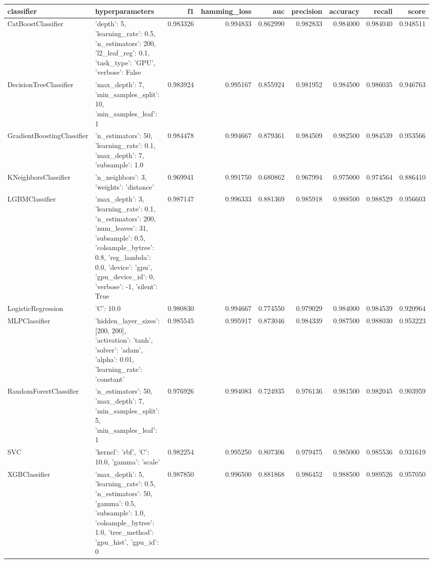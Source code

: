 \begin{tabular}{llrrrrrrr}
\toprule
classifier & hyperparameters & f1 & hamming_loss & auc & precision & accuracy & recall & score \\
\midrule
CatBoostClassifier & {'depth': 5, 'learning_rate': 0.5, 'n_estimators': 200, 'l2_leaf_reg': 0.1, 'task_type': 'GPU', 'verbose': False} & 0.983326 & 0.994833 & 0.862990 & 0.982833 & 0.984000 & 0.984040 & 0.948511 \\
DecisionTreeClassifier & {'max_depth': 7, 'min_samples_split': 10, 'min_samples_leaf': 1} & 0.983924 & 0.995167 & 0.855924 & 0.981952 & 0.984500 & 0.986035 & 0.946763 \\
GradientBoostingClassifier & {'n_estimators': 50, 'learning_rate': 0.1, 'max_depth': 7, 'subsample': 1.0} & 0.984478 & 0.994667 & 0.879361 & 0.984509 & 0.982500 & 0.984539 & 0.953566 \\
KNeighborsClassifier & {'n_neighbors': 3, 'weights': 'distance'} & 0.969941 & 0.991750 & 0.680862 & 0.967994 & 0.975000 & 0.974564 & 0.886410 \\
LGBMClassifier & {'max_depth': 3, 'learning_rate': 0.1, 'n_estimators': 200, 'num_leaves': 31, 'subsample': 0.5, 'colsample_bytree': 0.8, 'reg_lambda': 0.0, 'device': 'gpu', 'gpu_device_id': 0, 'verbose': -1, 'silent': True} & 0.987147 & 0.996333 & 0.881369 & 0.985918 & 0.988500 & 0.988529 & 0.956603 \\
LogisticRegression & {'C': 10.0} & 0.980830 & 0.994667 & 0.774550 & 0.979029 & 0.984000 & 0.984539 & 0.920964 \\
MLPClassifier & {'hidden_layer_sizes': [200, 200], 'activation': 'tanh', 'solver': 'adam', 'alpha': 0.01, 'learning_rate': 'constant'} & 0.985545 & 0.995917 & 0.873046 & 0.984339 & 0.987500 & 0.988030 & 0.953223 \\
RandomForestClassifier & {'n_estimators': 50, 'max_depth': 7, 'min_samples_split': 5, 'min_samples_leaf': 1} & 0.976926 & 0.994083 & 0.724935 & 0.976136 & 0.981500 & 0.982045 & 0.903959 \\
SVC & {'kernel': 'rbf', 'C': 10.0, 'gamma': 'scale'} & 0.982254 & 0.995250 & 0.807306 & 0.979475 & 0.985000 & 0.985536 & 0.931619 \\
XGBClassifier & {'max_depth': 5, 'learning_rate': 0.5, 'n_estimators': 50, 'gamma': 0.5, 'subsample': 1.0, 'colsample_bytree': 1.0, 'tree_method': 'gpu_hist', 'gpu_id': 0} & 0.987850 & 0.996500 & 0.881868 & 0.986452 & 0.988500 & 0.989526 & 0.957050 \\
\bottomrule
\end{tabular}
